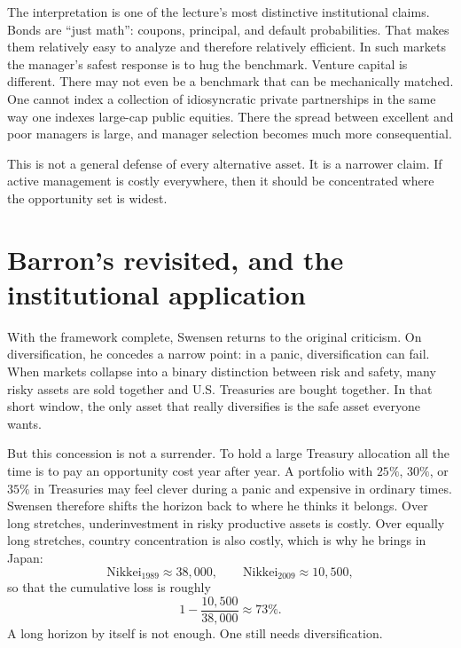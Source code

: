 The interpretation is one of the lecture's most distinctive institutional claims. Bonds are ``just math'': coupons, principal, and default probabilities. That makes them relatively easy to analyze and therefore relatively efficient. In such markets the manager's safest response is to hug the benchmark. Venture capital is different. There may not even be a benchmark that can be mechanically matched. One cannot index a collection of idiosyncratic private partnerships in the same way one indexes large-cap public equities. There the spread between excellent and poor managers is large, and manager selection becomes much more consequential.

This is not a general defense of every alternative asset. It is a narrower claim. If active management is costly everywhere, then it should be concentrated where the opportunity set is widest.

\section{Barron's revisited, and the institutional application}

With the framework complete, Swensen returns to the original criticism. On diversification, he concedes a narrow point: in a panic, diversification can fail. When markets collapse into a binary distinction between risk and safety, many risky assets are sold together and U.S. Treasuries are bought together. In that short window, the only asset that really diversifies is the safe asset everyone wants.

But this concession is not a surrender. To hold a large Treasury allocation all the time is to pay an opportunity cost year after year. A portfolio with \(25\%\), \(30\%\), or \(35\%\) in Treasuries may feel clever during a panic and expensive in ordinary times. Swensen therefore shifts the horizon back to where he thinks it belongs. Over long stretches, underinvestment in risky productive assets is costly. Over equally long stretches, country concentration is also costly, which is why he brings in Japan:
\begin{equation}
\text{Nikkei}_{1989}\approx 38{,}000,\qquad \text{Nikkei}_{2009}\approx 10{,}500,
\end{equation}
so that the cumulative loss is roughly
\begin{equation}
1-\frac{10{,}500}{38{,}000}\approx 73\%.
\end{equation}
A long horizon by itself is not enough. One still needs diversification.

